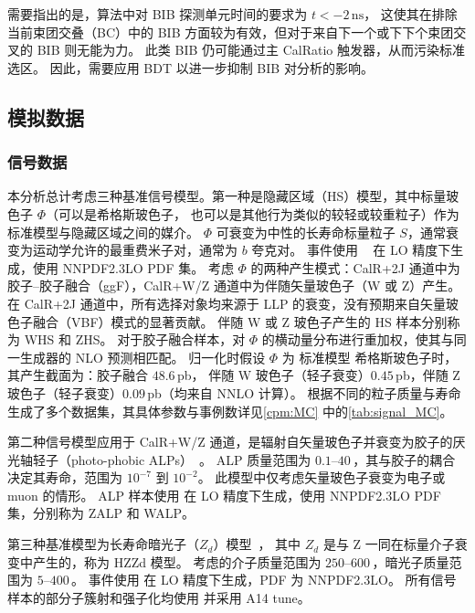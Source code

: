 需要指出的是，算法中对 BIB 探测单元时间的要求为 $t < -2\,\mathrm{ns}$，
这使其在排除当前束团交叠（BC）中的 BIB 方面较为有效，但对于来自下一个或下下个束团交叉的 BIB 则无能为力。
此类 BIB 仍可能通过主 CalRatio 触发器，从而污染标准选区。
因此，需要应用 BDT 以进一步抑制 BIB 对分析的影响。


\subsection{模拟数据}
\label{sec:MC}

\subsubsection{信号数据}
本分析总计考虑三种基准信号模型。第一种是隐藏区域（HS）模型，其中标量玻色子 $\Phi$（可以是希格斯玻色子，
也可以是其他行为类似的较轻或较重粒子）作为标准模型与隐藏区域之间的媒介。
$\Phi$ 可衰变为中性的长寿命标量粒子 $S$，通常衰变为运动学允许的最重费米子对，通常为 $b$ 夸克对。
事件使用 ~\cite{Alwall:2014hca} 在 LO 精度下生成，使用 NNPDF2.3LO PDF 集。
考虑 $\Phi$ 的两种产生模式：CalR+2J 通道中为胶子--胶子融合（ggF），CalR+W/Z 通道中为伴随矢量玻色子（W 或 Z）产生。
在 CalR+2J 通道中，所有选择对象均来源于 LLP 的衰变，没有预期来自矢量玻色子融合（VBF）模式的显著贡献。
伴随 W 或 Z 玻色子产生的 HS 样本分别称为 WHS 和 ZHS。
对于胶子融合样本，对 $\Phi$ 的横动量分布进行重加权，使其与同一生成器的 NLO 预测相匹配。
归一化时假设 $\Phi$ 为 标准模型 希格斯玻色子时，其产生截面为：胶子融合 $48.6$\,pb，
伴随 W 玻色子（轻子衰变）$0.45$\,pb，伴随 Z 玻色子（轻子衰变）$0.09$\,pb（均来自 NNLO 计算）。
根据不同的粒子质量与寿命生成了多个数据集，其具体参数与事例数详见\autoref{cpm:MC} 中的\autoref{tab:signal_MC}。

第二种信号模型应用于 CalR+W/Z 通道，是辐射自矢量玻色子并衰变为胶子的厌光轴轻子（photo-phobic ALPs）~\cite{Brivio:2017ije}。
ALP 质量范围为 $0.1$--$40$\,\GeV，其与胶子的耦合决定其寿命，范围为 $10^{-7}$ 到 $10^{-2}$。
此模型中仅考虑矢量玻色子衰变为电子或 muon 的情形。
ALP 样本使用  在 LO 精度下生成，使用 NNPDF2.3LO PDF 集，分别称为 ZALP 和 WALP。

第三种基准模型为长寿命暗光子（$Z_d$）模型~\cite{Davoudiasl:2012ag, Davoudiasl:2013aya}，
其中 $Z_d$ 是与 Z 一同在标量介子衰变中产生的，称为 HZZd 模型。
考虑的介子质量范围为 $250$--$600$\,\GeV，暗光子质量范围为 $5$--$400$\,\GeV。
事件使用   在 LO 精度下生成，PDF 为 NNPDF2.3LO。
所有信号样本的部分子簇射和强子化均使用  并采用 A14 tune。

